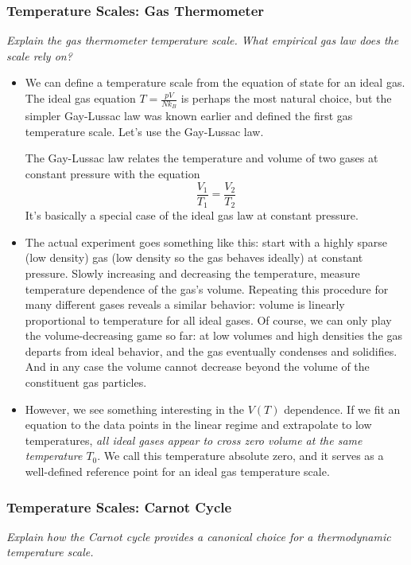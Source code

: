 \documentclass[11pt, a4paper]{article}
\begin{document}
\subsubsection{Temperature Scales: Gas Thermometer}
\textit{Explain the gas thermometer temperature scale. What empirical gas law does the scale rely on?}
\begin{itemize}
	\item We can define a temperature scale from the equation of state for an ideal gas. The ideal gas equation $ T = \frac{pV}{Nk_{B}} $ is perhaps the most natural choice, but the simpler Gay-Lussac law was known earlier and defined the first gas temperature scale. Let's use the Gay-Lussac law.
	
	The Gay-Lussac law relates the temperature and volume of two gases at constant pressure with the equation
	\begin{equation*}
		\frac{V_{1}}{T_{1}} = \frac{V_{2}}{T_{2}}
	\end{equation*}
	It's basically a special case of the ideal gas law at constant pressure.
	
	\item The actual experiment goes something like this: start with a highly sparse (low density) gas (low density so the gas behaves ideally) at constant pressure. Slowly increasing and decreasing the temperature, measure temperature dependence of the gas's volume. Repeating this procedure for many different gases reveals a similar behavior: volume is linearly proportional to temperature for all ideal gases. Of course, we can only play the volume-decreasing game so far: at low volumes and high densities the gas departs from ideal behavior, and the gas eventually condenses and solidifies. And in any case the volume cannot decrease beyond the volume of the constituent gas particles.
	
	\item However, we see something interesting in the $ V(T) $ dependence. If we fit an equation to the data points in the linear regime and extrapolate to low temperatures, \textit{all ideal gases appear to cross zero volume at the same temperature $ T_{0} $}. We call this temperature absolute zero, and it serves as a well-defined reference point for an ideal gas temperature scale.
	

\end{itemize}


\subsubsection{Temperature Scales: Carnot Cycle}
\textit{Explain how the Carnot cycle provides a canonical choice for a thermodynamic temperature scale.}
\smallskip
\end{document}
